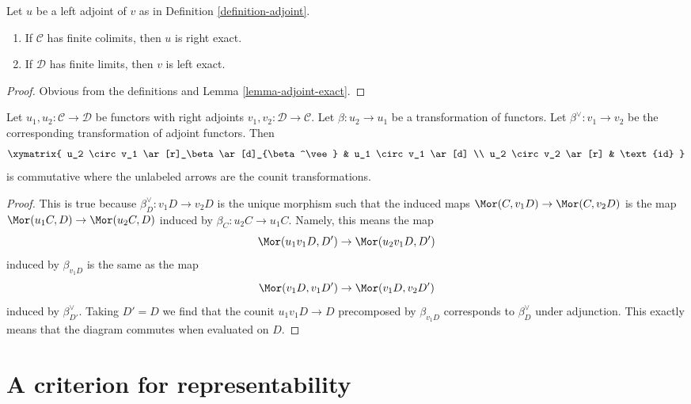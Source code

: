 \begin{lemma}
\label{lemma-exact-adjoint}
Let $u$ be a left adjoint of $v$ as in Definition \ref{definition-adjoint}.
\begin{enumerate}
\item If $\mathcal{C}$ has finite colimits, then $u$ is right exact.
\item If $\mathcal{D}$ has finite limits, then $v$ is left exact.
\end{enumerate}
\end{lemma}

\begin{proof}
Obvious from the definitions and Lemma \ref{lemma-adjoint-exact}.
\end{proof}

\begin{lemma}
\label{lemma-transformation-between-functors-and-adjoints}
Let $u_1, u_2 : \mathcal{C} \to \mathcal{D}$ be functors with right
adjoints $v_1, v_2 : \mathcal{D} \to \mathcal{C}$. Let $\beta : u_2 \to u_1$
be a transformation of functors. Let $\beta^\vee : v_1 \to v_2$ be
the corresponding transformation of adjoint functors. Then
$$
\xymatrix{
u_2 \circ v_1 \ar[r]_\beta \ar[d]_{\beta^\vee} &
u_1 \circ v_1 \ar[d] \\
u_2 \circ v_2 \ar[r] & \text{id}
}
$$
is commutative where the unlabeled arrows are the counit transformations.
\end{lemma}

\begin{proof}
This is true because $\beta^\vee_D : v_1D \to v_2D$ is the unique
morphism such that the induced maps $\Mor(C, v_1D) \to \Mor(C, v_2D)$
is the map $\Mor(u_1C, D) \to \Mor(u_2C, D)$ induced by
$\beta_C : u_2C \to u_1C$. Namely, this means the map
$$
\Mor(u_1 v_1 D, D') \to \Mor(u_2 v_1 D, D')
$$
induced by $\beta_{v_1 D}$ is the same as the map
$$
\Mor(v_1 D, v_1 D') \to \Mor(v_1 D, v_2 D')
$$
induced by $\beta^\vee_{D'}$. Taking $D' = D$ we find that the counit
$u_1 v_1 D \to D$ precomposed by $\beta_{v_1D}$ corresponds to $\beta^\vee_D$
under adjunction. This exactly means that the diagram commutes when
evaluated on $D$.
\end{proof}






\section{A criterion for representability}
\label{section-representable}

